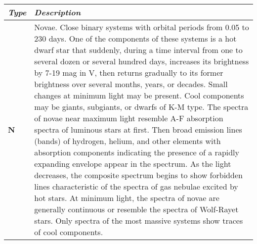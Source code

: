 \begin{longtabu} to \textwidth {l|X}
\toprule
\emph{Type} & \emph{Description}\tabularnewline
\midrule
\textbf{N} & Novae. Close binary systems with orbital periods from 0.05
to 230 days. One of the components of these systems is a hot dwarf star
that suddenly, during a time interval from one to several dozen or
several hundred days, increases its brightness by 7-19 mag in V, then
returns gradually to its former brightness over several months, years,
or decades. Small changes at minimum light may be present. Cool
components may be giants, subgiants, or dwarfs of K-M type. The spectra
of novae near maximum light resemble A-F absorption spectra of luminous
stars at first. Then broad emission lines (bands) of hydrogen, helium,
and other elements with absorption components indicating the presence of
a rapidly expanding envelope appear in the spectrum. As the light
decreases, the composite spectrum begins to show forbidden lines
characteristic of the spectra of gas nebulae excited by hot stars. At
minimum light, the spectra of novae are generally continuous or resemble
the spectra of Wolf-Rayet stars. Only spectra of the most massive
systems show traces of cool components.


\end{longtabu}
